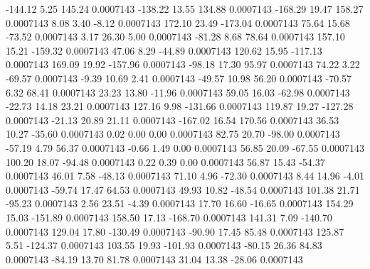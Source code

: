      -144.12        5.25      145.24     0.0007143
     -138.22       13.55      134.88     0.0007143
     -168.29       19.47      158.27     0.0007143
        8.08        3.40       -8.12     0.0007143
      172.10       23.49     -173.04     0.0007143
       75.64       15.68      -73.52     0.0007143
        3.17       26.30        5.00     0.0007143
      -81.28        8.68       78.64     0.0007143
      157.10       15.21     -159.32     0.0007143
       47.06        8.29      -44.89     0.0007143
      120.62       15.95     -117.13     0.0007143
      169.09       19.92     -157.96     0.0007143
      -98.18       17.30       95.97     0.0007143
       74.22        3.22      -69.57     0.0007143
       -9.39       10.69        2.41     0.0007143
      -49.57       10.98       56.20     0.0007143
      -70.57        6.32       68.41     0.0007143
       23.23       13.80      -11.96     0.0007143
       59.05       16.03      -62.98     0.0007143
      -22.73       14.18       23.21     0.0007143
      127.16        9.98     -131.66     0.0007143
      119.87       19.27     -127.28     0.0007143
      -21.13       20.89       21.11     0.0007143
     -167.02       16.54      170.56     0.0007143
       36.53       10.27      -35.60     0.0007143
        0.02        0.00        0.00     0.0007143
       82.75       20.70      -98.00     0.0007143
      -57.19        4.79       56.37     0.0007143
       -0.66        1.49        0.00     0.0007143
       56.85       20.09      -67.55     0.0007143
      100.20       18.07      -94.48     0.0007143
        0.22        0.39        0.00     0.0007143
       56.87       15.43      -54.37     0.0007143
       46.01        7.58      -48.13     0.0007143
       71.10        4.96      -72.30     0.0007143
        8.44       14.96       -4.01     0.0007143
      -59.74       17.47       64.53     0.0007143
       49.93       10.82      -48.54     0.0007143
      101.38       21.71      -95.23     0.0007143
        2.56       23.51       -4.39     0.0007143
       17.70       16.60      -16.65     0.0007143
      154.29       15.03     -151.89     0.0007143
      158.50       17.13     -168.70     0.0007143
      141.31        7.09     -140.70     0.0007143
      129.04       17.80     -130.49     0.0007143
      -90.90       17.45       85.48     0.0007143
      125.87        5.51     -124.37     0.0007143
      103.55       19.93     -101.93     0.0007143
      -80.15       26.36       84.83     0.0007143
      -84.19       13.70       81.78     0.0007143
       31.04       13.38      -28.06     0.0007143
